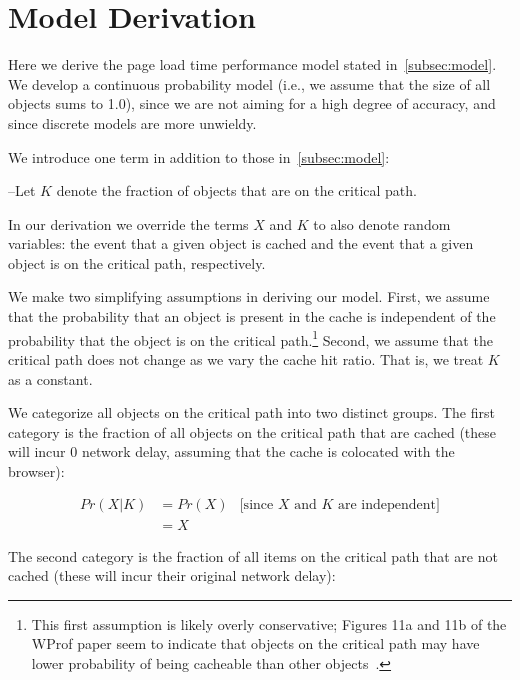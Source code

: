 \appendix
\section{Model Derivation}
\label{sec:appendix}

Here we derive the page load time performance model stated in~\ref{subsec:model}. We
develop a continuous probability model (i.e., we assume that the size of all
objects sums to 1.0), since we are not aiming for a high degree of accuracy,
and since discrete models are more unwieldy.


We introduce one term in addition to those in~\ref{subsec:model}:

\noindent--Let $K$ denote the fraction of objects that are on the critical path.

In our derivation we override the terms $X$ and $K$ to also denote random
variables: the event that a given object is cached and the event that a given
object is on the critical path, respectively.

We make two simplifying assumptions in deriving our model. First, we assume that the probability that an
object is present in the cache is independent of the probability that the
object is on the critical path.\footnote{
This first assumption is likely overly conservative; Figures 11a and 11b of the
WProf paper seem to indicate that objects on the critical path may have lower
probability of being cacheable than other objects~\cite{wang2013demystifying}.}
Second, we assume that the critical path does not change as we vary the cache hit
ratio. That is, we treat $K$ as a constant.

We categorize all objects on the critical path into two distinct groups.
The first category is the fraction of all objects on the critical path that are cached (these
will incur 0 network delay, assuming that the cache is colocated with the
browser):

\begin{align*}
Pr(X|K) & =  Pr(X) & \text{[since $X$ and $K$ are independent]} \\
& = X &
\end{align*}

The second category is the fraction of all items on the critical path that are not cached (these will incur their original network delay):

